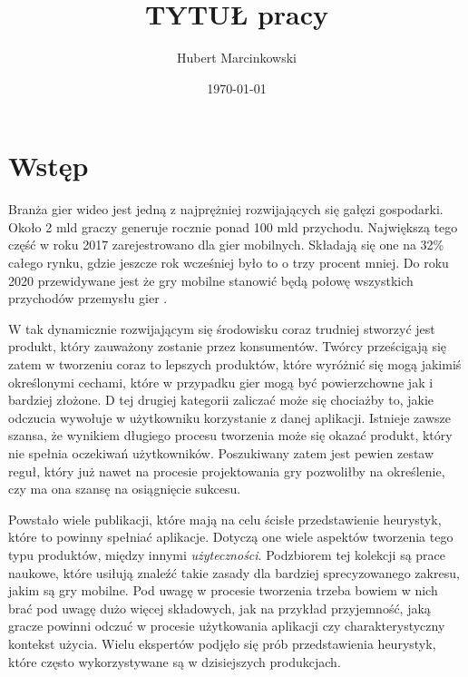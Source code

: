 \documentclass[a4paper,12pt,numbers=noenddot]{report}
\title{TYTUŁ pracy}
\date{\today}
\author{Hubert Marcinkowski}
\begin{document}
	\nocite{*}
	

	\newpage
	\tableofcontents
	\newpage
\chapter{Wstęp}
Branża gier wideo jest jedną z najprężniej rozwijających się gałęzi gospodarki. Około 2 mld graczy generuje rocznie ponad 100 mld przychodu. Największą tego część w roku 2017 zarejestrowano dla gier mobilnych. Składają się one na 32\% całego rynku, gdzie jeszcze rok wcześniej było to o trzy procent mniej. Do roku 2020 przewidywane jest że gry mobilne stanowić będą połowę wszystkich przychodów przemysłu gier \cite{art_Market2017}. 

W tak dynamicznie rozwijającym się środowisku coraz trudniej stworzyć jest produkt, który zauważony zostanie przez konsumentów. Twórcy prześcigają się zatem w tworzeniu coraz to lepszych produktów, które wyróżnić się mogą jakimiś określonymi cechami, które w przypadku gier mogą być powierzchowne jak i bardziej złożone. D tej drugiej kategorii zaliczać może się chociażby to, jakie odczucia wywołuje w użytkowniku korzystanie z danej aplikacji. Istnieje zawsze szansa, że wynikiem długiego procesu tworzenia może się okazać produkt, który nie spełnia oczekiwań użytkowników. Poszukiwany zatem jest pewien zestaw reguł, który już nawet na procesie projektowania gry pozwoliłby na określenie, czy ma ona szansę na osiągnięcie sukcesu. 

Powstało wiele publikacji, które mają na celu ścisłe przedstawienie heurystyk, które to powinny spełniać aplikacje. Dotyczą one wiele aspektów tworzenia tego typu produktów, między innymi \textit{użyteczności}. Podzbiorem tej kolekcji są prace naukowe, które usiłują znaleźć takie zasady dla bardziej sprecyzowanego zakresu, jakim są gry mobilne. Pod uwagę w procesie tworzenia trzeba bowiem w nich brać pod uwagę dużo więcej składowych, jak na przykład przyjemność, jaką gracze powinni odczuć w procesie użytkowania aplikacji czy charakterystyczny kontekst użycia. Wielu ekspertów podjęło się prób przedstawienia heurystyk, które często wykorzystywane są w dzisiejszych produkcjach.
\end{document}
